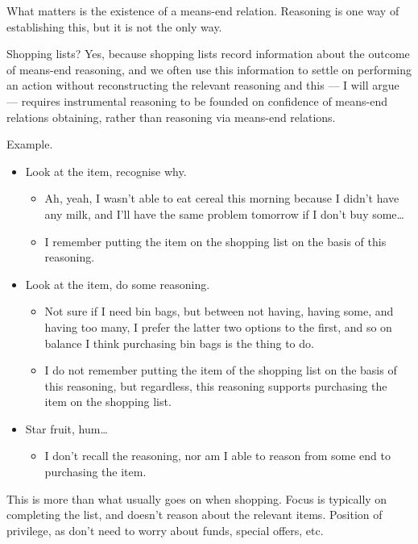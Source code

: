 \documentclass[10pt]{article}
\newcommand{\hozlinedash}[0]{%
  \noindent\hdashrule[0.5ex][c]{\textwidth}{.1pt}{2.5pt}
}
\begin{document}
\begin{wodge}
  What matters is the existence of a means-end relation.
  Reasoning is one way of establishing this, but it is not the only way.
\end{wodge}

\hozlinedash

\noindent Shopping lists?\newline
Yes, because shopping lists record information about the outcome of means-end reasoning, and we often use this information to settle on performing an action without reconstructing the relevant reasoning and this --- I will argue --- requires instrumental reasoning to be founded on confidence of means-end relations obtaining, rather than reasoning via means-end relations.

Example.

\begin{itemize}
\item Look at the item, recognise why.
  \begin{itemize}
  \item Ah, yeah, I wasn't able to eat cereal this morning because I didn't have any milk, and I'll have the same problem tomorrow if I don't buy some\dots
  \item I remember putting the item on the shopping list on the basis of this reasoning.
  \end{itemize}
\item Look at the item, do some reasoning.
  \begin{itemize}
  \item Not sure if I need bin bags, but between not having, having some, and having too many, I prefer the latter two options to the first, and so on balance I think purchasing bin bags is the thing to do.
  \item I do not remember putting the item of the shopping list on the basis of this reasoning, but regardless, this reasoning supports purchasing the item on the shopping list.
  \end{itemize}
\item Star fruit, hum\dots
  \begin{itemize}
  \item I don't recall the reasoning, nor am I able to reason from some end to purchasing the item.
  \end{itemize}
\end{itemize}

This is more than what usually goes on when shopping.
Focus is typically on completing the list, and doesn't reason about the relevant items.
Position of privilege, as don't need to worry about funds, special offers, etc.
\end{document}
